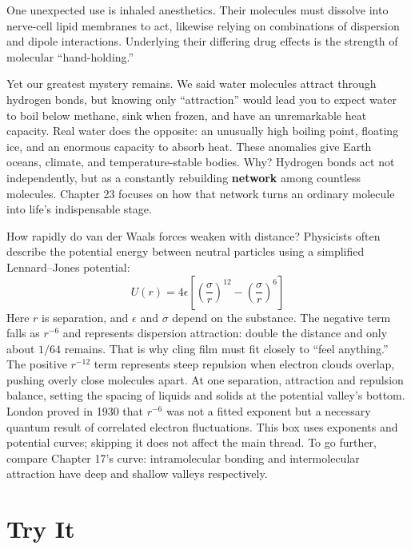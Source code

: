 One unexpected use is inhaled anesthetics. Their molecules must dissolve into nerve-cell lipid membranes to act, likewise relying on combinations of dispersion and dipole interactions. Underlying their differing drug effects is the strength of molecular ``hand-holding.''

Yet our greatest mystery remains. We said water molecules attract through hydrogen bonds, but knowing only ``attraction'' would lead you to expect water to boil below methane, sink when frozen, and have an unremarkable heat capacity. Real water does the opposite: an unusually high boiling point, floating ice, and an enormous capacity to absorb heat. These anomalies give Earth oceans, climate, and temperature-stable bodies. Why? Hydrogen bonds act not independently, but as a constantly rebuilding \textbf{network} among countless molecules. Chapter 23 focuses on how that network turns an ordinary molecule into life's indispensable stage.

\begin{tiaozhan}
How rapidly do van der Waals forces weaken with distance? Physicists often describe the potential energy between neutral particles using a simplified Lennard--Jones potential:
\[
U(r) = 4\epsilon\left[\left(\frac{\sigma}{r}\right)^{12} - \left(\frac{\sigma}{r}\right)^{6}\right]
\]
Here $r$ is separation, and $\epsilon$ and $\sigma$ depend on the substance. The negative term falls as $r^{-6}$ and represents dispersion attraction: double the distance and only about $1/64$ remains. That is why cling film must fit closely to ``feel anything.'' The positive $r^{-12}$ term represents steep repulsion when electron clouds overlap, pushing overly close molecules apart. At one separation, attraction and repulsion balance, setting the spacing of liquids and solids at the potential valley's bottom. London proved in 1930 that $r^{-6}$ was not a fitted exponent but a necessary quantum result of correlated electron fluctuations. This box uses exponents and potential curves; skipping it does not affect the main thread. To go further, compare Chapter 17's curve: intramolecular bonding and intermolecular attraction have deep and shallow valleys respectively.
\end{tiaozhan}

\section*{Try It}

